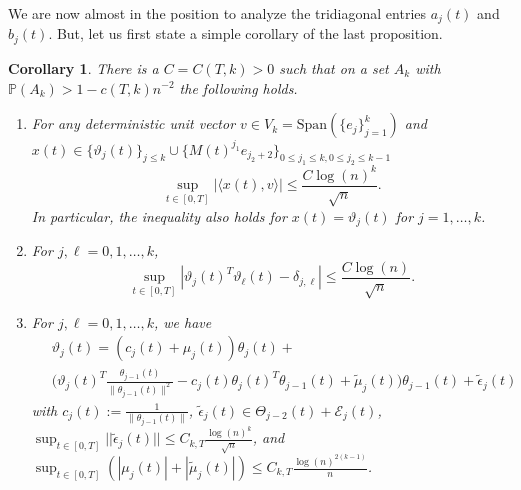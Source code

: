 \documentclass{amsart}
\newtheorem{cor}[thm]{Corollary}
\numberwithin{equation}{section}
\newcommand{\pr}{\mathbb{P}}
\newcommand{\la}{\langle}
\newcommand{\ra}{\rangle}
\begin{document}
We are now almost in the position to analyze the tridiagonal entries $a_j(t)$ and $b_j(t)$. But, let us first state a simple corollary of the last proposition.
\begin{cor}\label{vartheta expansion and analysis}
    There is a $C=C(T,k)>0$ such that on a set $A_k$ with $\pr(A_k)>1-c(T,k)n^{-2}$ the following holds.
    \begin{enumerate}
        \item For any deterministic unit vector $v \in V_{k}=\mathrm{Span}(\{e_j\}_{j=1}^k)$ and $x(t) \in \{\vartheta_j(t)\}_{j\leq k} \cup\{M(t)^{j_1}e_{j_2+2}\}_{0 \leq j_1 \leq k, 0 \leq j_2 \leq k-1}$
    \begin{equation}
        \sup_{t \in [0,T]} |\la x(t),v \ra| \leq \frac{C\log(n)^k}{\sqrt{n}}.
        \label{Single Component bound var}
    \end{equation}
    In particular, the inequality also holds for $x(t)=\vartheta_j(t)$ for $j=1,\dots ,k$.
    \item For $j, \ell =0,1,\dots,k$,
    \begin{equation}
        \sup_{t \in [0,T]} |\vartheta_j(t)^T\vartheta_{\ell}(t)-\delta_{j,\ell}| \leq \frac{C\log(n)}{\sqrt{n}}.
        \label{inner product concentration var}
    \end{equation}
    \item For $j, \ell =0,1,\dots ,k$, we have
    \begin{equation}\label{Robust vartheta expansion}
        \begin{split}
            ~&\vartheta_j(t)=(c_j(t)+\mu_j(t))\theta_j(t)+\\
            &\bigg( \vartheta_j(t)^T\frac{\theta_{j-1}(t)}{\|\theta_{j-1}(t)\|^2}-c_j(t)\theta_j(t)^T\theta_{j-1}(t)+\tilde{\mu}_j(t)\bigg)\theta_{j-1}(t)+\tilde{\epsilon}_{j}(t)
        \end{split}
    \end{equation}
     with $c_j(t):=\frac{1}{\|\theta_{j-1}(t)\|}$, $\tilde{\epsilon}_{j}(t) \in \Theta_{j-2}(t)+ \mathcal{E}_j(t)$, $\sup_{t \in [0,T]}||\tilde{\epsilon}_{j}(t)|| \leq C_{k,T} \frac{\log(n)^{k}}{\sqrt{n}}$, and $\sup_{t \in [0,T]} (|\mu_j(t)|+|\tilde{\mu}_j(t)|) \leq C_{k,T}\frac{\log(n)^{2(k-1)}}{n}$.
    \end{enumerate} 
\end{cor}
\end{document}
